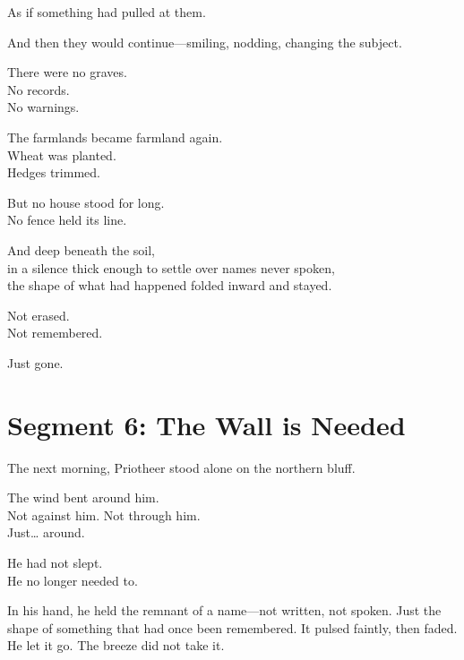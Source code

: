 \documentclass[9pt]{article}
\begin{document}
\vspace{0.5em}
As if something had pulled at them.

\vspace{0.5em}
And then they would continue---smiling, nodding, changing the subject.

\vspace{0.5em}
There were no graves.\\
No records.\\
No warnings.

\vspace{0.5em}
The farmlands became farmland again.\\
Wheat was planted.\\
Hedges trimmed.

\vspace{0.5em}
But no house stood for long.\\
No fence held its line.

\vspace{0.5em}
And deep beneath the soil,\\
in a silence thick enough to settle over names never spoken,\\
the shape of what had happened folded inward and stayed.

\vspace{0.5em}
Not erased.\\
Not remembered.

\vspace{0.5em}
Just gone.

\newpage

\section*{Segment 6: The Wall is Needed}

The next morning, Priotheer stood alone on the northern bluff.

\vspace{0.5em}
The wind bent around him.\\
Not against him. Not through him.\\
Just\ldots{} around.

\vspace{0.5em}
He had not slept.\\
He no longer needed to.

\vspace{0.5em}
In his hand, he held the remnant of a name---not written, not spoken. Just the shape of something that had once been remembered. It pulsed faintly, then faded. He let it go. The breeze did not take it.
\end{document}
